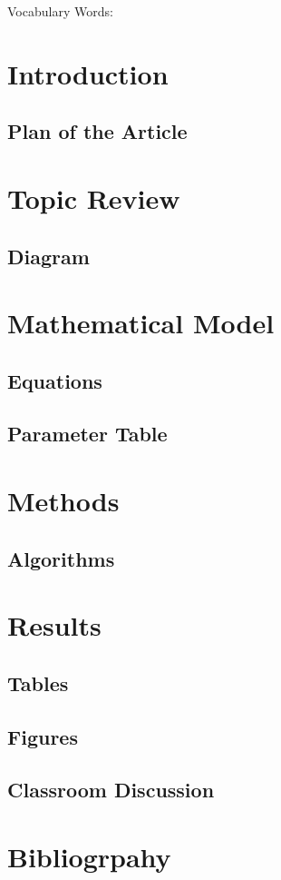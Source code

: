 
Vocabulary Words:

\section{Introduction}

\subsection{Plan of the Article}

\section{Topic Review}

\subsection{Diagram}

\section{Mathematical Model}

\subsection{Equations}

\subsection{Parameter Table}

\section{Methods}

\subsection{Algorithms}

\section{Results}

\subsection{Tables}

\subsection{Figures}

\subsection{Classroom Discussion}

\section{Bibliogrpahy}
